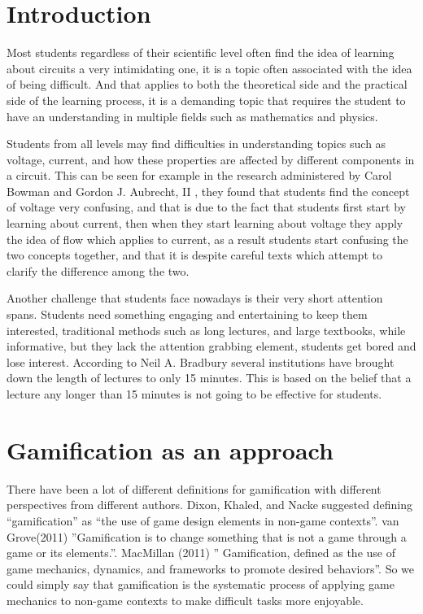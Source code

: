\documentclass[twoside,a4paper,11pt]{article}
\begin{document}
\begin{multicols}{2}
\footnotesize
\justifying
\section{Introduction}

Most students regardless of their scientific level often find the idea of learning about circuits a very intimidating one, it is a topic often associated with the idea of being difficult. And that applies to both the theoretical side and the practical side of the learning process, it is a demanding topic that requires the student to have an understanding in multiple fields such as mathematics and physics. 

Students from all levels may find difficulties in understanding topics such as voltage, current, and how these properties are affected by different components in a circuit. This can be seen for example in the research administered by Carol Bowman and Gordon J. Aubrecht, II \cite{1}, they found that students find the concept of voltage very confusing, and that is due to the fact that students first start by learning about current, then when they start learning about voltage they apply the idea of flow which applies to current, as a result students start confusing the two concepts together, and that it is despite careful texts which attempt to clarify the difference among the two.

Another challenge that students face nowadays is their very short attention spans. Students need something engaging and entertaining to keep them interested, traditional methods such as long lectures, and large textbooks, while informative, but they lack the attention grabbing element, students get bored and lose interest. According to Neil A. Bradbury \cite{17} several institutions have brought down the length of lectures to only 15 minutes. This is based on the belief that a lecture any longer than 15 minutes is not going to be effective for students.
\vfill
\section{Gamification as an approach}
There have been a lot of different definitions for gamification with different perspectives from different authors. Dixon, Khaled, and Nacke suggested defining “gamification” as “the use of game design elements in non-game contexts”. van Grove(2011) \cite{2} ”Gamification is to change something that is not a game through a game or its elements.”. MacMillan (2011) \cite{3} ” Gamification, defined as the use of game mechanics, dynamics, and frameworks to promote desired behaviors”. So we could simply say that gamification is the systematic process of applying game mechanics to non-game contexts to make difficult tasks more enjoyable. 


\end{multicols}
\end{document}
